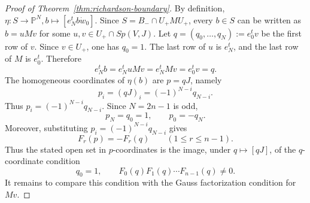 \documentclass{article}
\newcommand{\PP}{\mathbb{P}}
\begin{document}
\begin{proof}[Proof of Theorem~\ref{thm:richardson-boundary}]
By definition, \(\eta:S\longrightarrow \PP^N,b\longmapsto [e_N^tb\dot w_0]\). Since \(S=B_-\cap U_+MU_+\), every \(b\in S\) can be written as \(b=uMv\) for some \(u,v\in U_+\cap Sp(V,J)\). Let \(q=(q_0,\ldots,q_N):=e_0^tv\) be the first row of \(v\). Since \(v\in U_+\), one has \(q_0=1\). The last row of \(u\) is \(e_N^t\), and the last row of \(M\) is \(e_0^t\). Therefore
\[
e_N^tb=e_N^tuMv=e_N^tMv=e_0^tv=q.
\]
The homogeneous coordinates of \(\eta(b)\) are \(p=qJ\), namely
\[
p_i=(qJ)_i=(-1)^{N-i}q_{N-i}.
\]
Thus \(p_i=(-1)^{N-i}q_{N-i}\). Since \(N=2n-1\) is odd,
\[
p_N=q_0=1,
\qquad
p_0=-q_N.
\]
Moreover, substituting \(p_i=(-1)^{N-i}q_{N-i}\) gives
\[
F_r(p)=-F_r(q)
\qquad
(1\le r\le n-1).
\]
Thus the stated open set in \(p\)-coordinates is the image, under \(q\mapsto [qJ]\), of the \(q\)-coordinate condition
\[
q_0=1,\qquad F_0(q)F_1(q)\cdots F_{n-1}(q)\ne0.
\]
It remains to compare this condition with the Gauss factorization condition for \(Mv\).


\end{proof}
\end{document}
